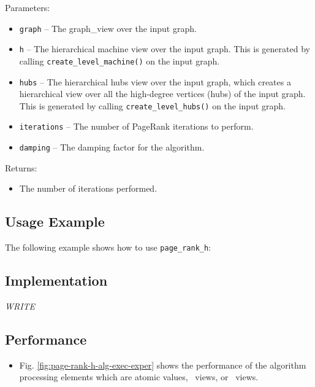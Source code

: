 Parameters:
\begin{itemize}
\item
\texttt{graph} --
The graph\_view over the input graph.
\item
\texttt{h} --
The hierarchical machine view over the input graph. This is generated by calling
\texttt{create\_level\_machine()} 
on the input graph.
\item
\texttt{hubs} --
The hierarchical hubs view over the input graph, which creates a hierarchical view over all the high-degree vertices (hubs) of the input graph. This is generated by calling 
\texttt{create\_level\_hubs()} 
on the input graph.
\item
\texttt{iterations} --
The number of PageRank iterations to perform.
\item
\texttt{damping} --
The damping factor for the algorithm.
\end{itemize}

Returns:
\begin{itemize}
\item
The number of iterations performed. 
\end{itemize}

\subsection{Usage Example} \label{sec-page-rank-h-alg-use}

The following example shows how to use 
\texttt{page\_rank\_h}:


\subsection{Implementation} \label{sec-page-rank-h-alg-impl}

\textit{WRITE}

\subsection{Performance} \label{sec-page-rank-h-alg-perf}

\begin{itemize}
\item
Fig. \ref{fig:page-rank-h-alg-exec-exper}
shows the performance of the algorithm processing
elements which are atomic values, \stl\ views, or \stapl\ views.
\end{itemize}

